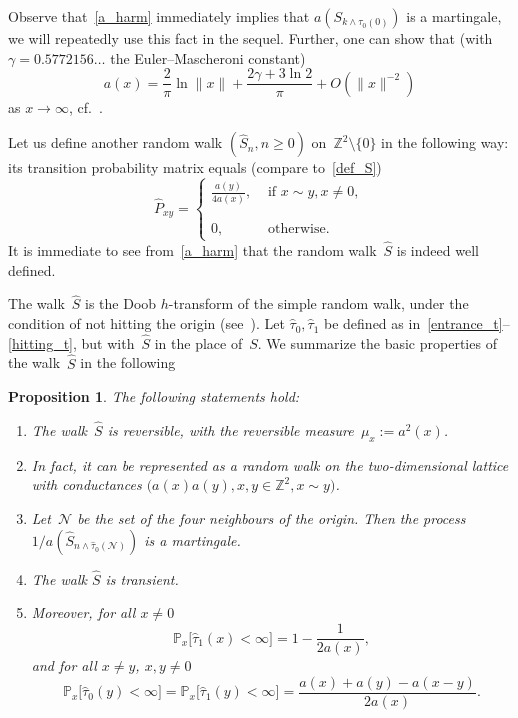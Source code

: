 \documentclass[11pt]{article}
\newtheorem{prop}[theo]{Proposition}
\theoremstyle{definition}
\numberwithin{equation}{section}
\numberwithin{figure}{section}
\numberwithin{table}{section}
\newcommand{\1}[1]{{\mathbf 1}{\{#1\}}}
\newcommand{\Z}{\mathbb{Z}}
\newcommand{\s}{{\widehat S}}
\newcommand{\8}{{\infty}}
\newcommand{\IP}{{\mathbb P}}
\newcommand{\hP}{\widehat{P}}
\newcommand{\htau}{\widehat{\tau}}
\begin{document}
Observe that~\eqref{a_harm} immediately implies that $a(S_{k\wedge \tau_0(0)})$ is a martingale, we will repeatedly use this fact in the sequel. Further, one can show that (with $\gamma=0.5772156\dots$ the Euler--Mascheroni constant)
\begin{equation}\label{formula_for_a}
a(x) = \frac{2}{\pi}\ln \|x\| + \frac{2\gamma+ 3\ln 2}{\pi} + O(\|x\|^{-2})
\end{equation}
as $x\to\infty$, cf.~\cite[Theorem~4.4.4]{LL10}.

Let us define another random walk $(\s_n, n\geq 0)$ on~$\Z^2\setminus \{0\}$ in the following way: its transition probability matrix equals (compare to~\eqref{def_S})
\begin{equation}\label{def_hatS}
\hP_{xy} =
\begin{cases}
\displaystyle\frac{a(y)}{4a(x)}, & \text{ if } x\sim y, x\neq 0,\\
0,\phantom{\int\limits^A} & \text{ otherwise.}
\end{cases}
\end{equation}
It is immediate to see from~\eqref{a_harm} that the random walk~$\s$ is indeed well defined.

The walk~$\s$ is the Doob $h$-transform of the simple random walk, under the condition of not hitting the origin (see~\cite[Lemma~3.3 and its proof]{CPV16}). Let $\htau_0, \htau_1$ be defined as in~\eqref{entrance_t}--\eqref{hitting_t}, but with~$\s$ in the place of~$S$. We summarize the basic properties of the walk~$\s$ in the following

\begin{prop}\label{p_basic_prop}
The following statements hold:
\begin{enumerate}
\item \label{1.1.1} The walk~$\s$ is reversible, with the reversible measure~$\mu_x:=a^2(x)$.
\item \label{1.1.2} In fact, it can be represented as a random walk on the two-dimensional lattice with conductances $\big(a(x)a(y), x,y\in \Z^2, x\sim y\big)$.
\item \label{1.1.3} Let~$\mathcal{N}$ be the set of the four neighbours of the origin. Then the process $1/a(\s_{n\wedge \htau_0(\mathcal{N})})$ is a martingale.
\item \label{1.1.4} The walk $\s$ is transient.
\item \label{1.1.5} Moreover, for all $x\neq 0$
\begin{equation}\label{escape_from_site}
\IP_x\big[\htau_1(x)<\infty\big] = 1-\frac{1}{2a(x)},
\end{equation}
and for all $x\neq y$, $x,y\neq 0$
\begin{equation}\label{not_hit_site}
\IP_x\big[\htau_0(y)<\infty\big] =
\IP_x\big[\htau_1(y)<\infty\big] = \frac{a(x)+a(y)-a(x-y)}{2a(x)}.
\end{equation}
\end{enumerate}
\end{prop}
\end{document}
